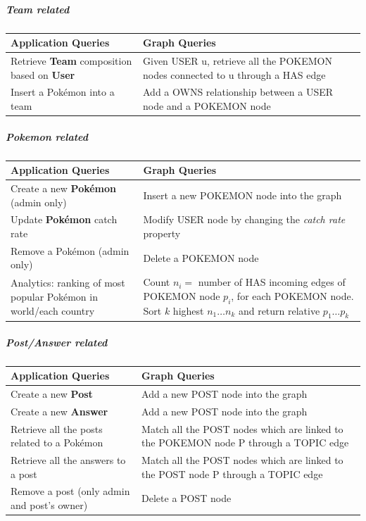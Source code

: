 \subparagraph{Team related}
\begin{center}
	\begin{tabular}{|p{}| p{} |} 
		\hline
		\textbf{Application Queries} & \textbf{Graph Queries} \\ [0.5ex] 
		\hline
		Retrieve \textbf{Team} composition based on \textbf{User}		
		& Given USER u, retrieve all the POKEMON nodes connected to u through a HAS edge\\ 
		\hline
		Insert a Pokémon into a team
		& Add a OWNS relationship between a USER node and a POKEMON node\\
		\hline
	\end{tabular}
\end{center}

\subparagraph{Pokemon related}
\begin{center}
	\begin{tabular}{|p{}| p{} |} 
		\hline
		\textbf{Application Queries} & \textbf{Graph Queries} \\ [0.5ex] 
		\hline
		Create a new \textbf{Pokémon} (admin only)		
		& Insert a new POKEMON node into the graph\\  
		\hline
		Update \textbf{Pokémon} catch rate
		& Modify USER node by changing the \textit{catch rate} property\\
		\hline
		Remove a Pokémon (admin only)
		& Delete a POKEMON node\\
		\hline	
		Analytics: ranking of most popular Pokémon in world/each country
		& Count $n_{i} = $ number of HAS incoming edges of POKEMON node $p_{i}$, for each POKEMON node.
		Sort $k$ highest $n_{1}…n_{k}$ and return relative $p_{1}…p_{k}$
		\\
		\hline
	\end{tabular}
\end{center}
\subparagraph{Post/Answer related}
\begin{center}
	\begin{tabular}{|p{}| p{} |} 
		\hline
		\textbf{Application Queries} & \textbf{Graph Queries} \\ [0.5ex] 
		\hline
		Create a new \textbf{Post}		
		& Add a new POST node into the graph\\ 
		\hline
		Create a new \textbf{Answer}	
		& Add a new POST node into the graph\\ 
		\hline	
		Retrieve all the posts related to a Pokémon
		& Match all the POST nodes which are linked to the POKEMON node P through a TOPIC edge\\
		\hline
		Retrieve all the answers to a post
		& Match all the POST nodes which are linked to the POST node P through a TOPIC edge\\
		\hline
		Remove a post (only admin and post’s owner)
		& Delete a POST node\\
		\hline	
	\end{tabular}
\end{center}



